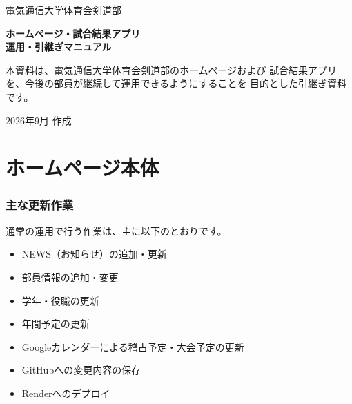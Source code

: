 \documentclass[a4paper,11pt]{ltjsarticle}
\begin{document}

\begin{titlepage}

\centering

\vspace*{35mm}

{\Large 電気通信大学体育会剣道部\par}

\vspace{12mm}

{\Huge\bfseries
ホームページ・試合結果アプリ\\
運用・引継ぎマニュアル
\par}

\vspace{18mm}

\vfill

\begin{flushleft}

本資料は、電気通信大学体育会剣道部のホームページおよび
試合結果アプリを、今後の部員が継続して運用できるようにすることを
目的とした引継ぎ資料です。


\end{flushleft}


\vfill

{\large 2026年9月 作成\par}

\end{titlepage}



\tableofcontents

\clearpage


\part{ホームページ本体}


\section{主な更新作業}

通常の運用で行う作業は、主に以下のとおりです。

\begin{itemize}
  \item NEWS（お知らせ）の追加・更新
  \item 部員情報の追加・変更
  \item 学年・役職の更新
  \item 年間予定の更新
  \item Googleカレンダーによる稽古予定・大会予定の更新
  \item GitHubへの変更内容の保存
  \item Renderへのデプロイ
\end{itemize}
\end{document}
